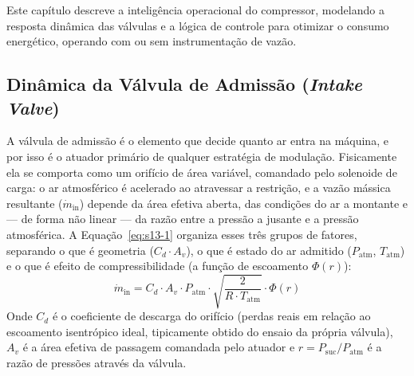 \documentclass[12pt,a4paper]{article}
\numberwithin{equation}{section}
\numberwithin{table}{section}
\numberwithin{figure}{section}
\begin{document}
{	
	Este capítulo descreve a inteligência operacional do compressor, modelando a resposta dinâmica das válvulas e a lógica de controle para otimizar o consumo energético, operando com ou sem instrumentação de vazão.
	
	\subsection{\textbf{Dinâmica da Válvula de Admissão (\textit{Intake Valve})}}
	A válvula de admissão é o elemento que decide quanto ar entra na máquina, e por isso é o atuador primário de qualquer estratégia de modulação. Fisicamente ela se comporta como um orifício de área variável, comandado pelo solenoide de carga: o ar atmosférico é acelerado ao atravessar a restrição, e a vazão mássica resultante ($\dot{m}_{\text{in}}$) depende da área efetiva aberta, das condições do ar a montante e — de forma não linear — da razão entre a pressão a jusante e a pressão atmosférica. A Equação~\eqref{eq:s13-1} organiza esses três grupos de fatores, separando o que é geometria ($C_d \cdot A_v$), o que é estado do ar admitido ($P_{\text{atm}}$, $T_{\text{atm}}$) e o que é efeito de compressibilidade (a função de escoamento $\Phi(r)$):
	\begin{equation}\label{eq:s13-1}
 \dot{m}_{\text{in}} = C_d \cdotp A_v \cdotp P_{\text{atm}} \cdotp \sqrt{\frac{2}{R \cdotp T_{\text{atm}}}} \cdotp \Phi(r)
\end{equation}
	Onde $C_d$ é o coeficiente de descarga do orifício (perdas reais em relação ao escoamento isentrópico ideal, tipicamente obtido do ensaio da própria válvula), $A_v$ é a área efetiva de passagem comandada pelo atuador e $r = P_{\text{suc}}/P_{\text{atm}}$ é a razão de pressões através da válvula.

}
\end{document}
